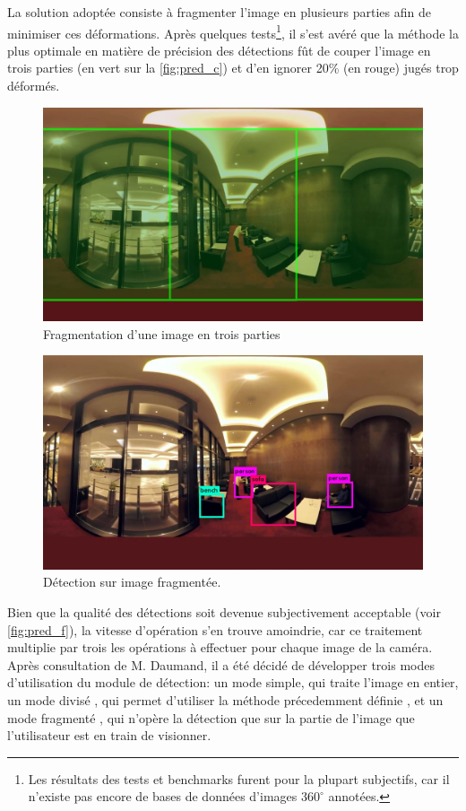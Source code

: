 			La solution adoptée consiste à fragmenter l'image en plusieurs parties afin de minimiser ces déformations. Après quelques tests\footnote{Les résultats des tests et benchmarks furent pour la plupart subjectifs, car il n'existe pas encore de bases de données d'images $360^{\circ}$ annotées.}, il s'est avéré que la méthode la plus optimale en matière de précision des détections fût de couper l'image en trois parties (en vert sur la \autoref{fig:pred_c}) et d'en ignorer 20\% (en rouge) jugés trop déformés.
			
			\begin{figure}[H]
			{
				\centering
				\includegraphics[width=.8\textwidth]{figures/predictions_cut.jpg}
				\caption{Fragmentation d'une image en trois parties}
				\label{fig:pred_c}
			}
			\end{figure}
			\begin{figure}[H]
			{
				\centering
				\includegraphics[width=.8\textwidth]{figures/predictions_f.jpg}
				\caption{Détection sur image fragmentée.}
				\label{fig:pred_f}
			}
			\end{figure}
			
			Bien que la qualité des détections soit devenue subjectivement acceptable (voir \autoref{fig:pred_f}), la vitesse d'opération s'en trouve amoindrie, car ce traitement multiplie par trois les opérations à effectuer pour chaque image de la caméra.
			Après consultation de M. Daumand, il a été décidé de développer trois modes d'utilisation du module de détection: un mode simple, qui traite l'image en entier, un mode \og divisé \fg{}, qui permet d'utiliser la méthode précedemment définie
			, et un mode \og fragmenté \fg{}, qui n'opère la détection que sur la partie de l'image que l'utilisateur est en train de visionner.
			
